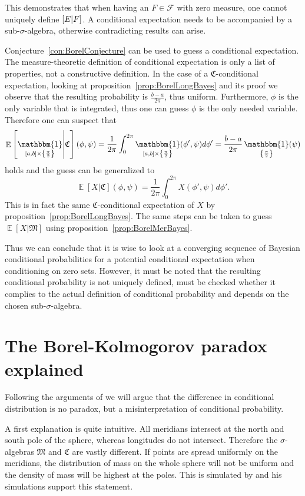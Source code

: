 \documentclass[twoside,a4paper]{report}
\theoremstyle{plain}
\theoremstyle{definition}
\theoremstyle{remark}
\numberwithin{equation}{chapter}
\let\P\relax
\DeclareMathOperator{\P}{\mathbb{P}}
\DeclareMathOperator{\E}{\mathbb{E}}
\DeclareMathOperator{\1}{\mathbbm{1}}
\newcommand{\F}{\mathcal{F}}
\begin{document}
This demonstrates that when having an $F\in\F$ with zero measure, one cannot uniquely define $\P[E|F]$. A conditional expectation needs to be accompanied by a sub-$\sigma$-algebra, otherwise contradicting results can arise.

Conjecture~\ref{con:BorelConjecture} can be used to guess a conditional expectation. The measure-theoretic definition of conditional expectation is only a list of properties, not a constructive definition. In the case of a $\mathfrak{C}$-conditional expectation, looking at proposition~\ref{prop:BorelLongBayes} and its proof we observe that the resulting probability is $\frac{b-a}{2\pi}$, thus uniform. Furthermore, $\phi$ is the only variable that is integrated, thus one can guess $\phi$ is the only needed variable. Therefore one can suspect that
\begin{equation}
\E\left[\1_{[a,b]\times\left\{\frac{\pi}{2}\right\}}\middle|\mathfrak{C}\right](\phi,\psi)=\frac{1}{2\pi}\int_0^{2\pi}\1_{[a,b]\times\left\{\frac{\pi}{2}\right\}}(\phi',\psi)d\phi'=\frac{b-a}{2\pi}\1_{\left\{\frac{\pi}{2}\right\}}(\psi)
\end{equation}
holds and the guess can be generalized to
\begin{equation}
\E[X|\mathfrak{C}](\phi,\psi)=\frac{1}{2\pi}\int_0^{2\pi}X(\phi',\psi)d\phi'.
\end{equation}
This is in fact the same $\mathfrak{C}$-conditional expectation of $X$ by proposition~\ref{prop:BorelLongBayes}. The same steps can be taken to guess $\E[X|\mathfrak{M}]$ using proposition~\ref{prop:BorelMerBayes}. 

Thus we can conclude that it is wise to look at a converging sequence of Bayesian conditional probabilities for a potential conditional expectation when conditioning on zero sets. However, it must be noted that the resulting conditional probability is not uniquely defined, must be checked whether it complies to the actual definition of conditional probability and depends on the chosen sub-$\sigma$-algebra.

\section{The Borel-Kolmogorov paradox explained}\label{sec:BorelExplained}
Following the arguments of \cite{Gyenis17} we will argue that the difference in conditional distribution is no paradox, but a misinterpretation of conditional probability.

A first explanation is quite intuitive. All meridians intersect at the north and south pole of the sphere, whereas longitudes do not intersect. Therefore the $\sigma$-algebras $\mathfrak{M}$ and $\mathfrak{C}$ are vastly different. If points are spread uniformly on the meridians, the distribution of mass on the whole sphere will not be uniform and the density of mass will be highest at the poles. This is simulated by \cite{Weisstein} and his simulations support this statement.
\end{document}
